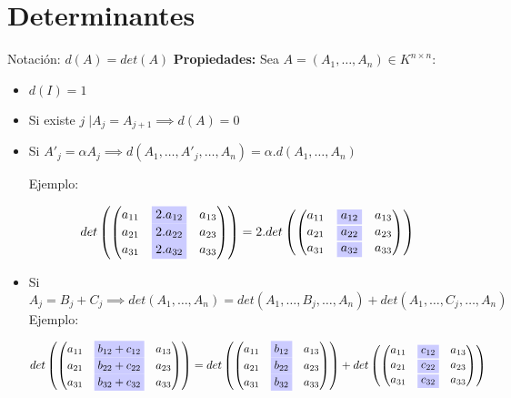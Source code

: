 \section*{Determinantes}
Notación: \(d(A) = det(A)\)
\textbf{Propiedades:} Sea \(A = \left(A_1, \dots, A_n\right) \in K^{n \times n}\):
\begin{itemize}
    \item \(d(I) = 1\)
    \item Si existe \(j \; \big| A_j = A_{j+1} \implies d(A) = 0\)
    \item Si \(A'_j = \alpha A_j \implies d(A_1, \dots,A'_j,\dots,A_n) = \alpha.d(A_1, \dots, A_n)\)
    
    Ejemplo:

\[det \left(
\begin{pmatrix}
    a_{11} & \colorbox{blue!20}{$2.a_{12}$} & a_{13} \\
    a_{21} & \colorbox{blue!20}{$2.a_{22}$} & a_{23} \\
    a_{31} & \colorbox{blue!20}{$2.a_{32}$} & a_{33} \\
\end{pmatrix} \right) = 2 . det\left(
\begin{pmatrix}
    a_{11} & \colorbox{blue!20}{$a_{12}$} & a_{13} \\
    a_{21} & \colorbox{blue!20}{$a_{22}$} & a_{23} \\
    a_{31} & \colorbox{blue!20}{$a_{32}$} & a_{33} \\
\end{pmatrix} \right)
\]
\item Si \(A_j = B_j + C_j \implies det\left(A_1, \dots , A_n\right) = det\left(A_1,\dots,B_j,\dots,A_n\right) + det\left(A_1,\dots,C_j,\dots,A_n\right) \)
Ejemplo:


\[det \left(
\begin{pmatrix}
    a_{11} & \colorbox{blue!20}{$b_{12} + c_{12}$} & a_{13} \\
    a_{21} & \colorbox{blue!20}{$b_{22} + c_{22}$} & a_{23} \\
    a_{31} & \colorbox{blue!20}{$b_{32} + c_{32}$} & a_{33} \\
\end{pmatrix} \right) =  det \left(
\begin{pmatrix}
    a_{11} & \colorbox{blue!20}{$b_{12}$} & a_{13} \\
    a_{21} & \colorbox{blue!20}{$b_{22}$} & a_{23} \\
    a_{31} & \colorbox{blue!20}{$b_{32}$} & a_{33} \\
\end{pmatrix} \right) + det\left(
\begin{pmatrix}
    a_{11} & \colorbox{blue!20}{$c_{12}$} & a_{13} \\
    a_{21} & \colorbox{blue!20}{$c_{22}$} & a_{23} \\
    a_{31} & \colorbox{blue!20}{$c_{32}$} & a_{33} \\
\end{pmatrix} \right)
\]
\end{itemize}
